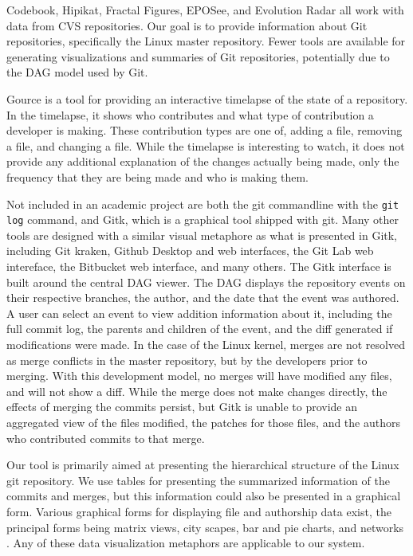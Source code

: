 Codebook, Hipikat, Fractal Figures, EPOSee, and Evolution Radar all work
with data from CVS repositories. Our goal is to provide information
about Git repositories, specifically the Linux master repository. Fewer
tools are available for generating visualizations and summaries of Git
repositories, potentially due to the DAG model used by Git.

Gource is a tool for providing an interactive timelapse of the state of
a repository\cite{Caudwell2010}. In the timelapse, it shows who
contributes and what type of contribution a developer is making. These
contribution types are one of, adding a file, removing a file, and
changing a file. While the timelapse is interesting to watch, it does
not provide any additional explanation of the changes actually being
made, only the frequency that they are being made and who is making
them.



Not included in an academic project are both the git commandline with
the \verb|git log| command, and Gitk, which is a graphical tool shipped
with git. Many other tools are designed with a similar visual metaphore
as what is presented in Gitk, including Git kraken, Github Desktop and
web interfaces, the Git Lab web intereface, the Bitbucket web interface,
and many others. The Gitk interface is built around the central DAG
viewer. The DAG displays the repository events on their respective
branches, the author, and the date that the event was authored. A user
can select an event to view addition information about it, including the
full commit log, the parents and children of the event, and the diff
generated if modifications were made. In the case of the Linux kernel,
merges are not resolved as merge conflicts in the master repository, but
by the developers prior to merging. With this development model, no
merges will have modified any files, and will not show a diff. While the
merge does not make changes directly, the effects of merging the
commits persist, but Gitk is unable to provide an aggregated view of the
files modified, the patches for those files, and the authors who
contributed commits to that merge.

Our tool is primarily aimed at presenting the hierarchical structure of
the Linux git repository. We use tables for presenting the summarized
information of the commits and merges, but this information could also
be presented in a graphical form. Various graphical forms for displaying
file and authorship data exist, the principal forms being matrix views,
city scapes, bar and pie charts, and networks \cite{Eick2002}. Any of
these data visualization metaphors are applicable to our system.

